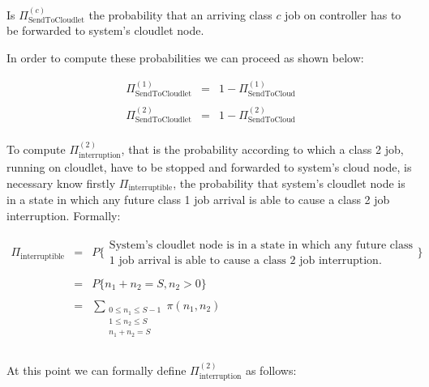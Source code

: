\documentclass[10pt,a4paper]{article}
\begin{document}
Is $\Pi_{\text{SendToCloudlet}}^{(c)}$ the probability that an arriving class $c$ job on controller has to be forwarded to system's cloudlet node. 

In order to compute these probabilities we can proceed as shown below:

\begin{equation}
\begin{array} {lcl} 
\Pi_{\text{SendToCloudlet}}^{(1)} & = & 1 - \Pi_{\text{SendToCloud}}^{(1)} \\
\\
\Pi_{\text{SendToCloudlet}}^{(2)} & = & 1 - \Pi_{\text{SendToCloud}}^{(2)} \\
\end{array}
\end{equation}

To compute $\Pi_{\text{interruption}}^{(2)}$, that is the probability according to which a class 2 job, running on cloudlet, have to be stopped and forwarded to system's cloud node, is necessary know firstly $\Pi_{\text{interruptible}}$, the probability that system's cloudlet node is in a state in which any future class 1 job arrival is able to cause a class 2 job interruption. Formally:

\begin{equation}
\begin{array} {lcl} 
\Pi_{\text{interruptible}} & = & P \bigg\{ \begin{array}{l} \text{System's cloudlet node is in a state in which any future class} \\ \text{1 job arrival is able to cause a class 2 job interruption.} \end{array} \bigg\} \\
\\
& = & P\lbrace{n_1 + n_2 = S, n_2 > 0}\rbrace \\ 
\\
& = & \displaystyle \sum_{\substack{0 \leq n_1 \leq S-1 \\ 1 \leq n_2 \leq S \\ n_1 + n_2 = S}} \pi(n_1,n_2) \\
\\
\end{array}
\end{equation}

At this point we can formally define $\Pi_{\text{interruption}}^{(2)}$ as follows:
\end{document}
